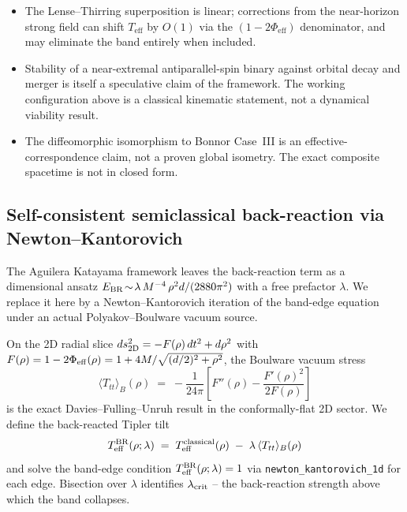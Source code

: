 \documentclass[11pt,a4paper]{article}
\begin{document}
\begin{itemize}[leftmargin=*]
\item The Lense--Thirring superposition is linear; corrections from the near-horizon strong field can shift $T_{\mathrm{eff}}$ by $O(1)$ via the $(1-2\Phi_{\mathrm{eff}})$ denominator, and may eliminate the band entirely when included.
\item Stability of a near-extremal antiparallel-spin binary against orbital decay and merger is itself a speculative claim of the framework. The working configuration above is a classical kinematic statement, not a dynamical viability result.
\item The diffeomorphic isomorphism to Bonnor Case~III is an effective-correspondence claim, not a proven global isometry. The exact composite spacetime is not in closed form.
\end{itemize}

\subsection{Self-consistent semiclassical back-reaction via Newton--Kantorovich}\label{ssec:toroidal_nk}

The Aguilera Katayama framework leaves the back-reaction term as a dimensional ansatz
$E_{\rm BR}\!\sim\!\lambda\, M^{-4}\,\rho^{2}d/(2880\pi^{2})$ with a free prefactor $\lambda$.
We replace it here by a Newton--Kantorovich iteration of the band-edge equation under an actual Polyakov--Boulware vacuum source.

On the 2D radial slice $ds^{2}_{2\rm D}=-F(\rho)\,dt^{2}+d\rho^{2}$ with $F(\rho)=1-2\Phi_{\rm eff}(\rho)=1+4M/\sqrt{(d/2)^{2}+\rho^{2}}$, the Boulware vacuum stress
\begin{equation}
\langle T_{tt}\rangle_{B}(\rho)\;=\;-\frac{1}{24\pi}\!\left[F''(\rho)-\frac{F'(\rho)^{2}}{2F(\rho)}\right]
\end{equation}
is the exact Davies--Fulling--Unruh result in the conformally-flat 2D sector. We define the back-reacted Tipler tilt
\begin{equation}
T_{\rm eff}^{\rm BR}(\rho;\lambda)\;=\;T_{\rm eff}^{\rm classical}(\rho)\;-\;\lambda\,\langle T_{tt}\rangle_{B}(\rho)
\end{equation}
and solve the band-edge condition $T_{\rm eff}^{\rm BR}(\rho;\lambda)=1$ via \texttt{newton\_kantorovich\_1d} for each edge. Bisection over $\lambda$ identifies $\lambda_{\rm crit}$ -- the back-reaction strength above which the band collapses.
\end{document}
